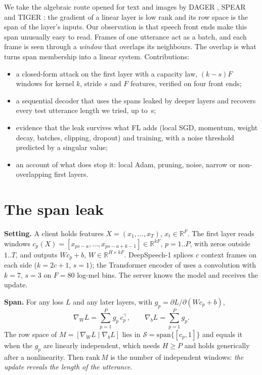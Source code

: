 \documentclass[a4paper]{esannV2}
\begin{document}
We take the algebraic route opened for text and images by DAGER \cite{petrov2024dager}, SPEAR
\cite{dimitrov2024spear} and TIGER \cite{kalikman2026tiger}: the gradient of a linear layer is low rank
and its row space is the span of the layer's inputs. Our observation is that speech front ends make this
span unusually easy to read. Frames of one utterance act as a batch, and each frame is seen through a
\emph{window} that overlaps its neighbours. The overlap is what turns span membership into a linear
system. Contributions:
\begin{itemize}
\item a closed-form attack on the first layer with a capacity law, $(k-s)F$ windows for kernel $k$,
stride $s$ and $F$ features, verified on four front ends;
\item a sequential decoder that uses the spans leaked by deeper layers and recovers every test
utterance length we tried, up to \DSlongMaxAudio\,s;
\item evidence that the leak survives what FL adds (local SGD, momentum, weight decay, batches,
clipping, dropout) and training, with a noise threshold predicted by a singular value;
\item an account of what does stop it: local Adam, pruning, noise, narrow or non-overlapping first layers.
\end{itemize}

\section{The span leak}

\textbf{Setting.} A client holds features $X=(x_1,\dots,x_T)$, $x_t\in\mathbb{R}^F$. The first layer
reads windows $c_p(X)=[x_{ps-a},\dots,x_{ps-a+k-1}]\in\mathbb{R}^{kF}$, $p=1..P$, with zeros outside
$1..T$, and outputs $Wc_p+b$, $W\in\mathbb{R}^{H\times kF}$. DeepSpeech-1 splices $c$ context frames on
each side ($k=2c+1$, $s=1$); the Transformer encoder of \cite{pelikan2025enabling} uses a convolution
with $k=7$, $s=3$ on $F=80$ log-mel bins. The server knows the model and receives the update.

\textbf{Span.} For any loss $L$ and any later layers, with $g_p=\partial L/\partial(Wc_p+b)$,
\[
\nabla_W L=\sum_{p=1}^{P} g_p\,c_p^{\top},\qquad \nabla_b L=\sum_{p=1}^{P} g_p .
\]
The row space of $M=[\nabla_W L\mid\nabla_b L]$ lies in $\mathcal{S}=\mathrm{span}\{[c_p,1]\}$ and
equals it when the $g_p$ are linearly independent, which needs $H\ge P$ and holds generically after a
nonlinearity. Then $\mathrm{rank}\,M$ is the number of independent windows: \emph{the update reveals the
length of the utterance}.
\end{document}
